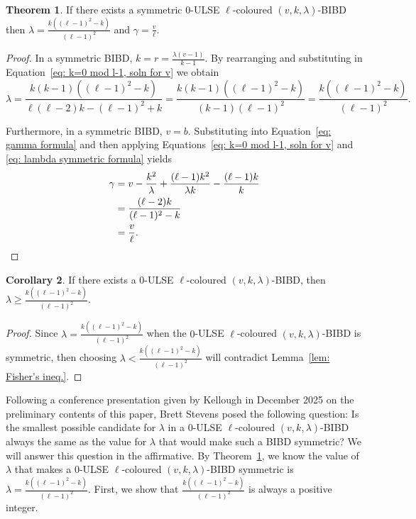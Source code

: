 \documentclass[12pt]{article}
\theoremstyle{definition}
\newtheorem{theorem}{Theorem}[section]
\newtheorem{corollary}[theorem]{Corollary}
\begin{document}
\begin{theorem}\label{thm: symmetric 0-ULSE lambda value}
    If there exists a symmetric $0$-ULSE $\ell$-coloured $(v,k,\lambda)$-BIBD then $\lambda = \frac{k((\ell-1)^2 - k)}{(\ell-1)^2}$ and $\gamma = \frac{v}{\ell}$.
\end{theorem}

\begin{proof}
    In a symmetric BIBD, $k = r = \frac{\lambda(v-1)}{k-1}$. By rearranging and substituting in Equation~\eqref{eq: k=0 mod l-1, soln for v} we obtain 
    \begin{equation}\label{eq: lambda symmetric formula}
    \lambda = \frac{k(k-1)((\ell-1)^2 - k)}{\ell(\ell-2)k - (\ell-1)^2 + k} = \frac{k(k-1)((\ell-1)^2 - k)}{(k-1)(\ell-1)^2} = \frac{k((\ell-1)^2 - k)}{(\ell-1)^2}.
    \end{equation}

    Furthermore, in a symmetric BIBD, $v=b$. Substituting into Equation~\eqref{eq: gamma formula} and then applying Equations~\eqref{eq: k=0 mod l-1, soln for v} and \eqref{eq: lambda symmetric formula} yields
    \begin{align*}
        \gamma &= v - \frac{k^2}{\lambda} + \frac{(\ell-1)k^2}{\lambda k} - \frac{(\ell-1)k}{k} \\
        &= \frac{(\ell-2)k}{(\ell-1)^2 - k} \\
        &= \frac{v}{\ell}. \qedhere
    \end{align*}
\end{proof}

\begin{corollary}\label{cor: bds on lambda in terms of k and ell}
    If there exists a $0$-ULSE $\ell$-coloured $(v,k,\lambda)$-BIBD, then $\lambda \geq \frac{k((\ell-1)^2 - k)}{(\ell-1)^2}$.
\end{corollary}

\begin{proof}
    Since $\lambda = \frac{k((\ell-1)^2 - k)}{(\ell-1)^2}$ when the $0$-ULSE $\ell$-coloured $(v,k,\lambda)$-BIBD is symmetric, then choosing $\lambda < \frac{k((\ell-1)^2 - k)}{(\ell-1)^2}$ will contradict Lemma~\ref{lem: Fisher's ineq.}.
\end{proof}

Following a conference presentation given by Kellough in December 2025 on the preliminary contents of this paper, Brett Stevens posed the following question: Is the smallest possible candidate for $\lambda$ in a $0$-ULSE $\ell$-coloured $(v,k,\lambda)$-BIBD always the same as the value for $\lambda$ that would make such a BIBD symmetric? We will answer this question in the affirmative. By Theorem~\ref{thm: symmetric 0-ULSE lambda value}, we know the value of $\lambda$ that makes a $0$-ULSE $\ell$-coloured $(v,k,\lambda)$-BIBD symmetric is $\lambda = \frac{k((\ell-1)^2 - k)}{(\ell-1)^2}$. First, we show that $\frac{k((\ell-1)^2 - k)}{(\ell-1)^2}$ is always a positive integer. 
\end{document}
